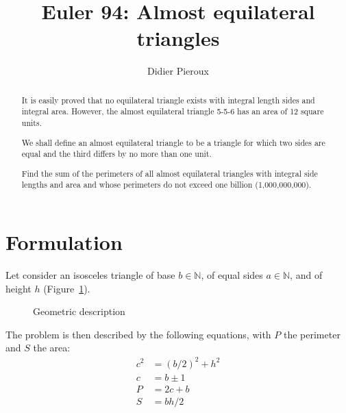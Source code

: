 \documentclass[11pt, a4paper]{article}
\newcommand{\Figure}[1]{Figure~\ref{#1}}
\newcommand{\set}[1]{\mathbb{#1}}
\begin{document}
\title{Euler 94: Almost equilateral triangles}
\date{}
\author{Didier Pieroux}
\maketitle

\begin{abstract}
It is easily proved that no equilateral triangle exists with integral length sides and integral area. However, the almost equilateral triangle 5-5-6 has an area of 12 square units.

We shall define an almost equilateral triangle to be a triangle for which two sides are equal and the third differs by no more than one unit.

Find the sum of the perimeters of all almost equilateral triangles with integral side lengths and area and whose perimeters do not exceed one billion (1,000,000,000).
\end{abstract}

\section{Formulation}
Let consider an isosceles triangle of base $b\in\set N$, of equal sides $a\in\set N$, and of height $h$ (\Figure{fig:triangle1}).
  
\begin{figure}[h]
    \begin{center}
        \caption{Geometric description}
        \label{fig:triangle1}
    \end{center}
\end{figure}

The problem is then described by the following equations, with $P$ the perimeter and $S$ the area:
\begin{align}
    c^2 & = (b/2)^2 + h^2 \\ \label{eq:pytha1}
    c & = b \pm 1 \\ \label{eq:ab}
    P & = 2c+b \\ 
    S & = bh/2 \\ \label{eq:S1}
\end{align} 
    
\end{document}
